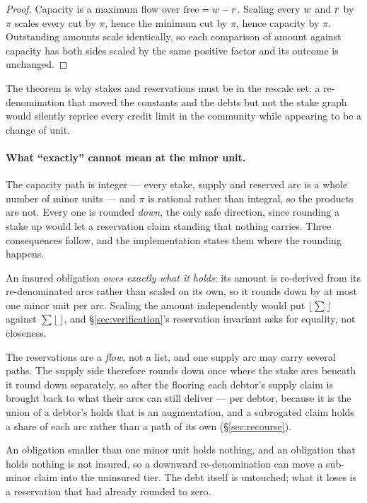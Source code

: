 \begin{proof}
Capacity is a maximum flow over $\mathrm{free} = w - r$. Scaling every $w$ and
$r$ by $\pi$ scales every cut by $\pi$, hence the minimum cut by $\pi$, hence
capacity by $\pi$. Outstanding amounts scale identically, so each comparison of amount
against capacity has both sides scaled by the same positive factor and its outcome is
unchanged.
\end{proof}

The theorem is why stakes and reservations must be in the rescale set: a re-denomination
that moved the constants and the debts but not the stake graph would silently reprice
every credit limit in the community while appearing to be a change of unit.

\paragraph{What ``exactly'' cannot mean at the minor unit.} The capacity path is
integer --- every stake, supply and reserved arc is a whole number of minor units --- and
$\pi$ is rational rather than integral, so the products are not. Every one is rounded
\emph{down}, the only safe direction, since rounding a stake up would let a reservation
claim standing that nothing carries. Three consequences follow, and the implementation
states them where the rounding happens.

An insured obligation \emph{owes exactly what it holds}: its amount is re-derived from
its re-denominated arcs rather than scaled on its own, so it rounds down by at most one
minor unit per arc. Scaling the amount independently would put $\lfloor \sum \rfloor$
against $\sum \lfloor\,\rfloor$, and \S\ref{sec:verification}'s reservation invariant
asks for equality, not closeness.

The reservations are a \emph{flow}, not a list, and one supply arc may carry several
paths. The supply side therefore rounds down once where the stake arcs beneath it round
down separately, so after the flooring each debtor's supply claim is brought back to what
their arcs can still deliver --- per debtor, because it is the union of a debtor's holds
that is an augmentation, and a subrogated claim holds a share of each arc rather than a
path of its own (\S\ref{sec:recourse}).

An obligation smaller than one minor unit holds nothing, and an obligation that holds
nothing is not insured, so a downward re-denomination can move a sub-minor claim into the
uninsured tier. The debt itself is untouched; what it loses is a reservation that had
already rounded to zero.
